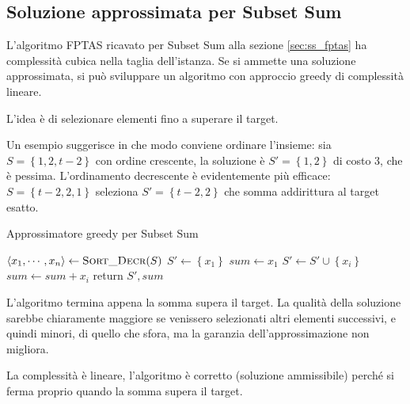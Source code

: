 \subsection{Soluzione approssimata per Subset Sum}

L'algoritmo FPTAS ricavato per Subset Sum alla sezione \ref{sec:ss_fptas} ha complessità cubica nella taglia dell'istanza. Se si ammette una soluzione approssimata, si può sviluppare un algoritmo con approccio greedy di complessità lineare.

L'idea è di selezionare elementi fino a superare il target.

Un esempio suggerisce in che modo conviene ordinare l'insieme: sia $
S = \left\{ 1, 2, t-2 \right\}
$ con ordine crescente, la soluzione è $S' = \left\{ 1, 2 \right\}$ di costo 3, che è pessima.
L'ordinamento decrescente è evidentemente più efficace: $
S = \left\{ t-2, 2, 1 \right\}
$ seleziona $
S' = \left\{ t-2, 2 \right\}
$ che somma addirittura al target esatto.
\begin{algorithm}[H]
\caption{Approssimatore greedy per Subset Sum}\label{alg:ss_approx_greedy}
\begin{algorithmic}[1]
        \State $\langle x_1, \cdots, x_n \rangle \gets \Call{Sort\_Decr}{S} $
        \State $S' \gets \left\{ x_1 \right\}$
        \State $sum \gets x_1$
                \State $S' \gets S' \cup \left\{ x_i \right\}$
                \State $sum \gets sum + x_i$
            \Else
                \State return $S', sum$
            \EndIf
        \EndFor
    \EndProcedure
\end{algorithmic}
\end{algorithm}
L'algoritmo termina appena la somma supera il target. La qualità della soluzione sarebbe chiaramente maggiore se venissero selezionati altri elementi successivi, e quindi minori, di quello che sfora, ma la garanzia dell'approssimazione non migliora.

La complessità è lineare, l'algoritmo è corretto (soluzione ammissibile) perché si ferma proprio quando la somma supera il target.

